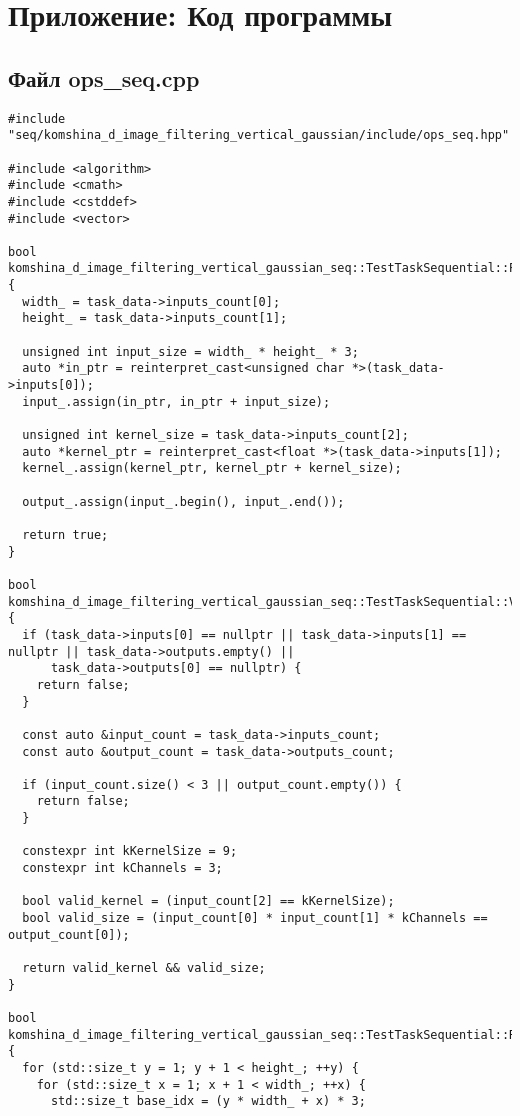 \documentclass[12pt]{article}
\begin{document}
\section*{Приложение: Код программы}

\subsection*{Файл ops\_seq.cpp}

\begin{lstlisting}
#include "seq/komshina_d_image_filtering_vertical_gaussian/include/ops_seq.hpp"

#include <algorithm>
#include <cmath>
#include <cstddef>
#include <vector>

bool komshina_d_image_filtering_vertical_gaussian_seq::TestTaskSequential::PreProcessingImpl() {
  width_ = task_data->inputs_count[0];
  height_ = task_data->inputs_count[1];

  unsigned int input_size = width_ * height_ * 3;
  auto *in_ptr = reinterpret_cast<unsigned char *>(task_data->inputs[0]);
  input_.assign(in_ptr, in_ptr + input_size);

  unsigned int kernel_size = task_data->inputs_count[2];
  auto *kernel_ptr = reinterpret_cast<float *>(task_data->inputs[1]);
  kernel_.assign(kernel_ptr, kernel_ptr + kernel_size);

  output_.assign(input_.begin(), input_.end());

  return true;
}

bool komshina_d_image_filtering_vertical_gaussian_seq::TestTaskSequential::ValidationImpl() {
  if (task_data->inputs[0] == nullptr || task_data->inputs[1] == nullptr || task_data->outputs.empty() ||
      task_data->outputs[0] == nullptr) {
    return false;
  }

  const auto &input_count = task_data->inputs_count;
  const auto &output_count = task_data->outputs_count;

  if (input_count.size() < 3 || output_count.empty()) {
    return false;
  }

  constexpr int kKernelSize = 9;
  constexpr int kChannels = 3;

  bool valid_kernel = (input_count[2] == kKernelSize);
  bool valid_size = (input_count[0] * input_count[1] * kChannels == output_count[0]);

  return valid_kernel && valid_size;
}

bool komshina_d_image_filtering_vertical_gaussian_seq::TestTaskSequential::RunImpl() {
  for (std::size_t y = 1; y + 1 < height_; ++y) {
    for (std::size_t x = 1; x + 1 < width_; ++x) {
      std::size_t base_idx = (y * width_ + x) * 3;


\end{lstlisting}
\end{document}
